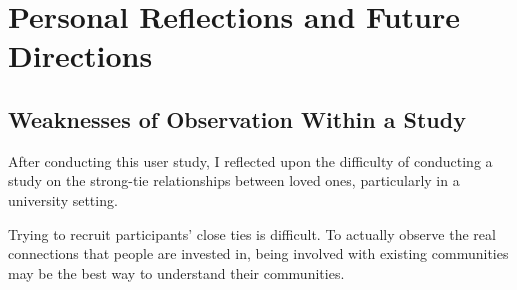\section{Personal Reflections and Future Directions}
  \subsection{Weaknesses of Observation Within a Study}
		After conducting this user study, I reflected upon the difficulty of
		conducting a study on the strong-tie relationships between
		loved ones, particularly in a university setting.

		Trying to recruit participants' close ties is difficult.
		To actually observe the real connections that people are invested in,
		being involved with existing communities may be the best way
		to understand their communities.

    
